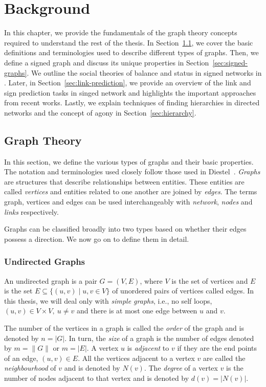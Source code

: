 
\chapter{Background}
\label{chp:background}

In this chapter, we provide the fundamentals of the graph theory concepts required to understand the rest of the thesis.
In Section~\ref{sec:prelim}, we cover the basic definitions and terminologies used to describe different types of graphs.
Then, we define a signed graph and discuss its unique properties in Section~\ref{sec:signed-graphs}.
We outline the social theories of balance and status in signed networks in .
Later, in Section~\ref{sec:link-prediction}, we provide an overview of the link and sign prediction tasks in singed network and highlights the important approaches from recent works.
Lastly, we explain techniques of finding hierarchies in directed networks and the concept of agony in Section~\ref{sec:hierarchy}.

\section{Graph Theory}
\label{sec:prelim}
In this section, we define the various types of graphs and their basic properties.
The notation and terminologies used closely follow those used in Diestel~\cite{diestel1997graph}.
\textit{Graphs} are structures that describe relationships between entities.
These entities are called \textit{vertices} and entities related to one another are joined by \textit{edges}.
The terms graph, vertices and edges can be used interchangeably with \textit{network}, \textit{nodes} and \textit{links} respectively.

Graphs can be classified broadly into two types based on whether their edges possess a direction.
We now go on to define them in detail.
\subsection{Undirected Graphs}
An undirected graph is a pair $G=(V,E)$, where $V$ is the set of vertices and $E$ is the set $E \subseteq \{ (u,v) \mid u,v \in V\}$ of unordered pairs of vertices called edges.
In this thesis, we will deal only with \textit{simple graphs}, i.e., no self loops, $(u,v)\in V \times V, ~ u\neq v$ and there is at most one edge between $u$ and $v$. 

The number of the vertices in a graph is called the \textit{order} of the graph and is denoted by $n= |G|$.
In turn, the \textit{size} of a graph is the number of edges denoted by $m = \|G\|$ or $m=|E|$.
A vertex $u$ is \textit{adjacent} to $v$ if they are the end points of an edge, $(u,v) \in E$.
All the vertices adjacent to a vertex $v$ are called the \textit{neighbourhood} of $v$ and is denoted by $N(v)$.
The \textit{degree} of a vertex $v$ is the number of nodes adjacent to that vertex and is denoted by $d(v) = |N(v)|$. 


